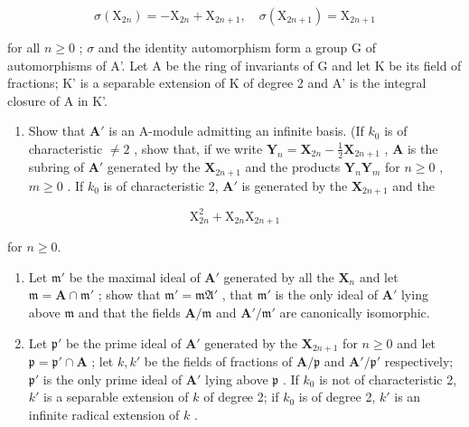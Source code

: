 \[
\sigma (\mathrm{X} _ {2 n}) = - \mathrm{X} _ {2 n} + \mathrm{X} _ {2 n + 1}, \quad \sigma (\mathrm{X} _ {2 n + 1}) = \mathrm{X} _ {2 n + 1}
\]

for all \(n \geqslant 0\) ; \(\sigma\) and the identity automorphism form a group G of automorphisms of A'. Let A be the ring of invariants of G and let K be its field of fractions; K' is a separable extension of K of degree 2 and A' is the integral closure of A in K'.

\begin{enumerate}
\def\labelenumi{(\alph{enumi})}
\tightlist
\item
  Show that \(\mathbf{A}'\) is an A-module admitting an infinite basis. (If \(k_0\) is of characteristic \(\neq 2\) , show that, if we write \(\mathbf{Y}_n = \mathbf{X}_{2n} - \frac{1}{2}\mathbf{X}_{2n+1}\) , \(\mathbf{A}\) is the subring of \(\mathbf{A}'\) generated by the \(\mathbf{X}_{2n+1}\) and the products \(\mathbf{Y}_n\mathbf{Y}_m\) for \(n \geqslant 0\) , \(m \geqslant 0\) . If \(k_0\) is of characteristic 2, \(\mathbf{A}'\) is generated by the \(\mathbf{X}_{2n+1}\) and the
\end{enumerate}

\[
\mathrm{X} _ {2 n} ^ {2} + \mathrm{X} _ {2 n} \mathrm{X} _ {2 n + 1}
\]

for \(n\geqslant 0.\)

\begin{enumerate}
\def\labelenumi{(\alph{enumi})}
\setcounter{enumi}{1}
\item
  Let \(\mathfrak{m}'\) be the maximal ideal of \(\mathbf{A}'\) generated by all the \(\mathbf{X}_n\) and let \(\mathfrak{m} = \mathbf{A} \cap \mathfrak{m}'\) ; show that \(\mathfrak{m}' = \mathfrak{mA}'\) , that \(\mathfrak{m}'\) is the only ideal of \(\mathbf{A}'\) lying above \(\mathfrak{m}\) and that the fields \(\mathbf{A} / \mathfrak{m}\) and \(\mathbf{A}' / \mathfrak{m}'\) are canonically isomorphic.
\item
  Let \(\mathfrak{p}'\) be the prime ideal of \(\mathbf{A}'\) generated by the \(\mathbf{X}_{2n+1}\) for \(n \geqslant 0\) and let \(\mathfrak{p} = \mathfrak{p}' \cap \mathbf{A}\) ; let \(k, k'\) be the fields of fractions of \(\mathbf{A}/\mathfrak{p}\) and \(\mathbf{A}'/\mathfrak{p}'\) respectively; \(\mathfrak{p}'\) is the only prime ideal of \(\mathbf{A}'\) lying above \(\mathfrak{p}\) . If \(k_0\) is not of characteristic 2, \(k'\) is a separable extension of \(k\) of degree 2; if \(k_0\) is of degree 2, \(k'\) is an infinite radical extension of \(k\) .
\end{enumerate}

